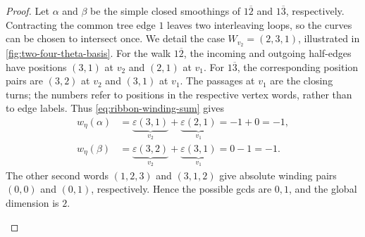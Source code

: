 \documentclass[11pt]{amsart}
\theoremstyle{definition}
\theoremstyle{plain}
\theoremstyle{definition}
\theoremstyle{definition}
\begin{document}
\begin{proof}
Let $\alpha$ and $\beta$ be the simple closed smoothings of
$1\overline2$ and $1\overline3$, respectively.
Contracting the common tree edge $1$ leaves two interleaving
loops, so the curves can be chosen to intersect once.
We detail the case $W_{v_2}=(2,3,1)$, illustrated in
\cref{fig:two-four-theta-basis}. For the walk $1\overline2$, the incoming and outgoing half-edges
have positions $(3,1)$ at $v_2$ and $(2,1)$ at $v_1$.
For $1\overline3$, the corresponding position pairs are
$(3,2)$ at $v_2$ and $(3,1)$ at $v_1$.
The passages at $v_1$ are the closing turns; the numbers
refer to positions in the respective vertex words,
rather than to edge labels.
Thus \eqref{eq:ribbon-winding-sum} gives
\[
\begin{aligned}
  w_\eta(\alpha)
    &=\underbrace{\varepsilon(3,1)}_{v_2}
      +\underbrace{\varepsilon(2,1)}_{v_1}
      =-1+0=-1,\\
  w_\eta(\beta)
    &=\underbrace{\varepsilon(3,2)}_{v_2}
      +\underbrace{\varepsilon(3,1)}_{v_1}
      =0-1=-1.
\end{aligned}
\]
The other second words $(1,2,3)$ and $(3,1,2)$ give absolute
winding pairs $(0,0)$ and $(0,1)$, respectively.  Hence the
possible gcds are $0,1$, and the global dimension is $2$.
\begin{figure}[htbp]
\centering
{}
\end{figure}
\end{proof}
\end{document}
